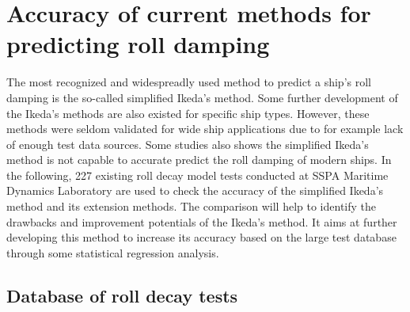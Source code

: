 \section{Accuracy of current methods for predicting roll damping}
The most recognized and widespreadly used method to predict a ship's roll damping is the so-called simplified Ikeda's method. Some further development of the Ikeda's methods are also existed for specific ship types. However, these methods were seldom validated for wide ship applications due to for example lack of enough test data sources. Some studies also shows the simplified Ikeda's method is not capable to accurate predict the roll damping of modern ships. In the following, 227 existing roll decay model tests conducted at SSPA Maritime Dynamics Laboratory are used to check the accuracy of the simplified Ikeda's method and its extension methods. The comparison will help to identify the drawbacks and improvement potentials of the Ikeda's method. It aims at further developing this method to increase its accuracy based on the large test database through some statistical regression analysis.     

\subsection{Database of roll decay tests}
\label{se:database_of_roll_decay_tests}




